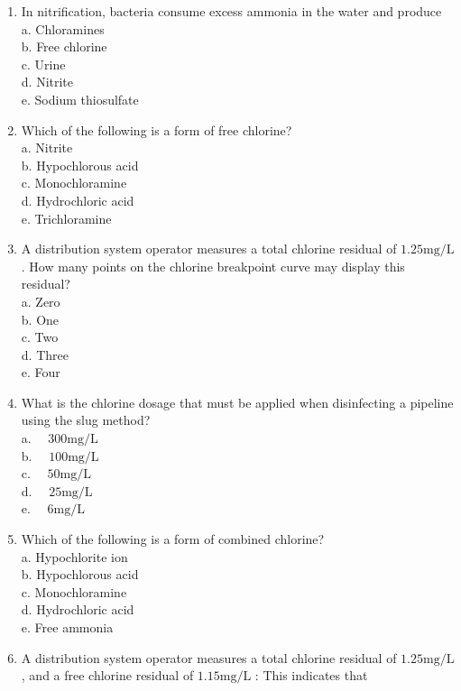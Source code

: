 \begin{enumerate}
\item In nitrification, bacteria consume excess ammonia in the water and produce\\
a. Chloramines\\
b. Free chlorine\\
c. Urine\\
d. Nitrite\\
e. Sodium thiosulfate\\
  \item Which of the following is a form of free chlorine?\\
a. Nitrite\\
b. Hypochlorous acid\\
c. Monochloramine\\
d. Hydrochloric acid\\
e. Trichloramine\\
  \item A distribution system operator measures a total chlorine residual of $1.25 \mathrm{mg} / \mathrm{L}$. How many points on the chlorine breakpoint curve may display this residual?\\
a. Zero\\
b. One\\
c. Two\\
d. Three\\
e. Four\\
  \item What is the chlorine dosage that must be applied when disinfecting a pipeline using the slug method?\\
a. $\quad 300 \mathrm{mg} / \mathrm{L}$\\
b. $\quad 100 \mathrm{mg} / \mathrm{L}$\\
c. $\quad 50 \mathrm{mg} / \mathrm{L}$\\
d. $\quad 25 \mathrm{mg} / \mathrm{L}$\\
e. $\quad 6 \mathrm{mg} / \mathrm{L}$ \\
\item Which of the following is a form of combined chlorine?\\
a. Hypochlorite ion\\
b. Hypochlorous acid\\
c. Monochloramine\\
d. Hydrochloric acid\\
e. Free ammonia\\
 \item A distribution system operator measures a total chlorine residual of $1.25 \mathrm{mg} / \mathrm{L}$, and a free chlorine residual of $1.15 \mathrm{mg} / \mathrm{L}$ : This indicates that\\

\end{enumerate}
